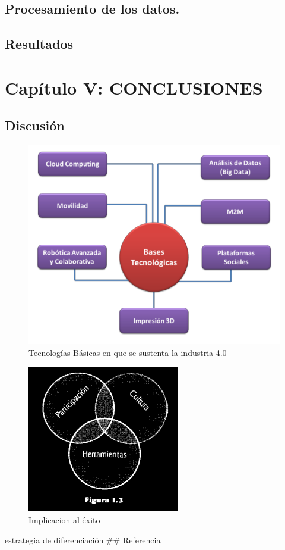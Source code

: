 \documentclass[
]{article}
\begin{document}
\hypertarget{procesamiento-de-los-datos.}{%
\subsection{Procesamiento de los
datos.}\label{procesamiento-de-los-datos.}}

\hypertarget{resultados}{%
\subsection{Resultados}\label{resultados}}

\hypertarget{capuxedtulo-v-conclusiones}{%
\section{Capítulo V: CONCLUSIONES}\label{capuxedtulo-v-conclusiones}}

\hypertarget{discusiuxf3n}{%
\subsection{Discusión}\label{discusiuxf3n}}

\begin{figure}

{\centering \includegraphics[width=0.5\linewidth]{marco teorico/Screenshot from 2021-11-01 14-03-25} 

}

\caption{Tecnologías Básicas en que se sustenta la industria 4.0}\label{fig:unnamed-chunk-17}
\end{figure}

\begin{figure}

{\centering \includegraphics[width=0.5\linewidth]{marco teorico/Screenshot from 2021-11-02 17-24-54} 

}

\caption{Implicacion al éxito}\label{fig:unnamed-chunk-18}
\end{figure}

estrategia de diferenciación \#\# Referencia
\end{document}

